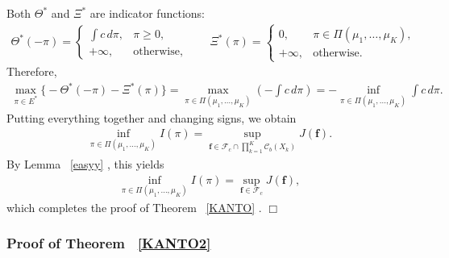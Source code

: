 \documentclass[twoside,11pt,a4paper]{article}
\newcommand*{\SavedRef}{}
\let\SavedRef\ref
\renewcommand*{\ref}[1]{  \begingroup
    \hypersetup{
      linkcolor=linkequation,
      linkbordercolor=linkequation,
    }    \SavedRef{#1}  \endgroup
}
\begin{document}
Both \(\Theta^{\ast}\) and \(\Xi^{\ast}\) are indicator functions:
\begin{align*}
\Theta^{\ast}(-\pi)=
\begin{cases}
\int c\, d\pi, & \pi\ge 0,\\[0.2em]
+\infty, & \text{otherwise},
\end{cases}
\qquad
\Xi^{\ast}(\pi)=
\begin{cases}
0, & \pi\in\Pi(\mu_{1},\ldots,\mu_{K}),\\[0.2em]
+\infty, & \text{otherwise}.
\end{cases}
\end{align*}
Therefore,
\begin{align*}
\max_{\pi\in E^{\ast}}
\big\{
-\Theta^{\ast}(-\pi)-\Xi^{\ast}(\pi)
\big\}
=
\max_{\pi\in\Pi(\mu_{1},\ldots,\mu_{K})}
\left(
-\int c\, d\pi
\right)
=
-\inf_{\pi\in\Pi(\mu_{1},\ldots,\mu_{K})}
\int c\, d\pi.
\end{align*}
Putting everything together and changing signs, we obtain
\begin{align*}
\inf_{\pi\in\Pi(\mu_{1},\ldots,\mu_{K})} I(\pi)
=
\sup_{\boldsymbol{f}\in \mathcal{F}_{c}\cap\prod_{k=1}^{K}\mathcal{C}_{b}(X_{k})}
J(\boldsymbol{f}).
\end{align*}
By Lemma~\ref{easyy}, this yields
\begin{align*}
\inf_{\pi\in\Pi(\mu_1,\ldots,\mu_K)} I(\pi)
=
\sup_{\boldsymbol f\in \mathcal F_c} J(\boldsymbol f),
\end{align*}
which completes the proof of Theorem~\ref{KANTO}.
\hfill\(\Box\)












\subsubsection*{Proof of Theorem~\ref{KANTO2}}
\end{document}
